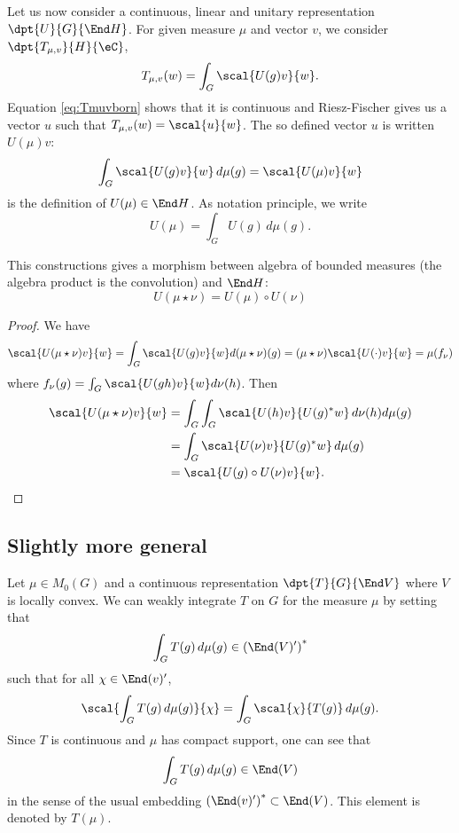 Let us now consider a continuous, linear and unitary representation $\dpt{U}{G}{\End H}$. For given measure $\mu$ and vector $v$, we consider $\dpt{T_{\mu,v}}{H}{\eC}$,
\[
	T_{\mu,v}(w)=\int_G\scal{U(g)v}{w}.
\]
Equation \eqref{eq:Tmuvborn} shows that it is continuous and Riesz-Fischer gives us a vector $u$ such that $T_{\mu,v}(w)=\scal{u}{w}$. The so defined vector $u$ is written $U(\mu)v$:
\begin{equation}
	\int_G \scal{U(g)v}{w}\,d\mu(g)=\scal{U(\mu)v}{w}
\end{equation}
is the definition of $U(\mu)\in\End H$. As notation principle, we write
\[
	U(\mu)=\int_GU(g)\,d\mu(g).
\]

\begin{proposition}

	This constructions gives a morphism between algebra of bounded measures (the algebra product is the convolution) and $\End H$:
	\begin{equation}
		U( \mu\star\nu)=U(\mu)\circ U(\nu)
	\end{equation}

\end{proposition}


\begin{proof}
	We have
	\begin{equation}
		\scal{U(\mu\star\nu)v}{w}=\int_G \scal{U(g)v}{w}d(\mu\star\nu)(g)
		=(\mu\star\nu)\scal{U(\cdot)v}{w}
		=\mu(f_{\nu})
	\end{equation}
	where $f_{\nu}(g)=\int_G\scal{U(gh)v}{w}d\nu(h)$. Then
	\begin{equation}
		\begin{split}
			\scal{U(\mu\star\nu)v}{w} & =\int_G\int_G \scal{U(h)v}{U(g)^*w}\,d\nu(h)d\mu(g) \\
			                          & =\int_G\scal{U(\nu)v}{U(g)^*w}\,d\mu(g)             \\
			                          & =\scal{U(g)\circ U(\nu)v}{w}.
		\end{split}
	\end{equation}
\end{proof}

\subsection{Slightly more general}

Let $\mu\in M_0(G)$ and a continuous representation $\dpt{T}{G}{\End V}$ where $V$ is locally convex. We can weakly integrate $T$ on $G$ for the measure $\mu$ by setting that
\[
	\int_G T(g)\,d\mu(g)\in\left( \End(V)' \right)^*
\]
such that for all $\chi\in\End(v)'$,
\begin{equation}
	\scal{\int_G T(g)\,d\mu(g)}{\chi}=\int_G\scal{\chi}{T(g)}\,d\mu(g).
\end{equation}
Since $T$ is continuous and $\mu$ has compact support, one can see that
\[
	\int_GT(g)\,d\mu(g)\in\End(V)
\]
in the sense of the usual embedding $\left( \End(v)' \right)^*\subset\End(V)$. This element is denoted by $T(\mu)$.

